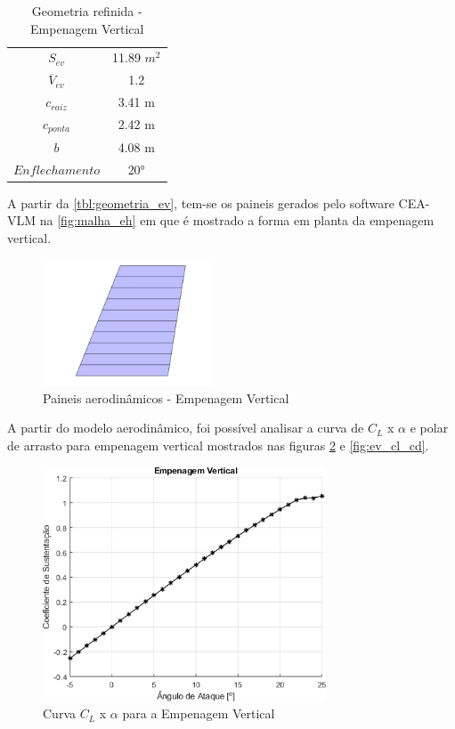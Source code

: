 \begin{table}[H]
\centering
\begin{tabular}{cc}
\toprule
$ S_{ev} $ & 11.89 $m^2$ \\
$ \overline{V}_{ev} $ & 1.2 \\
$ c_{raiz} $ & 3.41 m \\
$ c_{ponta} $ & 2.42 m \\
$ b $ & 4.08 m \\
$ Enflechamento $ & 20° \\
\bottomrule
\end{tabular}
\caption[Geometria refinada - Empenagem Vertical]{Geometria refinida - Empenagem Vertical}
\label{tbl:geometria_ev}
\end{table}

A partir da \autoref{tbl:geometria_ev}, tem-se os paineis gerados pelo software CEA-VLM na \autoref{fig:malha_eh} em que é mostrado a forma em planta da empenagem vertical.


\begin{figure}[H]
\centering
\includegraphics[width=0.45\textwidth]{images/parte3/malha_ev.PNG}
\caption[Paineis aerodinâmicos - Empenagem Vertical]{Paineis aerodinâmicos - Empenagem Vertical}
\label{fig:malha_ev}
\end{figure}

A partir do modelo aerodinâmico, foi possível analisar a curva de $C_L$ x $\alpha$ e polar de arrasto para empenagem vertical mostrados nas figuras \ref{fig:ev_cl_alfa} e \ref{fig:ev_cl_cd}.

\begin{figure}[H]
\centering
\includegraphics[width=0.75\textwidth]{images/parte3/ev_cl_alfa.png}
\caption[Curva $C_L$ x $\alpha$ para a Empenagem Vertical]{Curva $C_L$ x $\alpha$ para a Empenagem Vertical}
\label{fig:ev_cl_alfa}
\end{figure}

